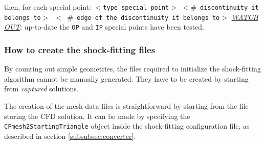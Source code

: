 \documentclass[11pt,a4paper,oneside]{article}
\begin{document}
\begin{itemize}
{\newline 
then, for each special point:
\newline
\newline 
\hspace*{0.2cm} \texttt{$<$type special point$>$}
\newline
\newline 
\hspace*{0.2cm} \texttt{$<$$\#$ discontinuity it belongs to$>$ $<$ $\#$ edge of the discontinuity it belongs to$>$}
\newline
\newline
\underline{\emph{WATCH OUT}}: up-to-date the \texttt{OP} and \texttt{IP} special points have been tested. }
\end{itemize}

\subsubsection{How to create the shock-fitting files}
By counting out simple geometries, the files required to initialize the shock-fitting algorithm cannot be manually generated. They have to be created by starting from \textit{captured} solutions.

The creation of the mesh data files is straightforward by starting from the file storing the CFD solution. It can be made by specifying the \texttt{CFmesh2StartingTriangle} object inside the shock-fitting configuration file, as described in section \ref{subsubsec:converter}.
\end{document}
